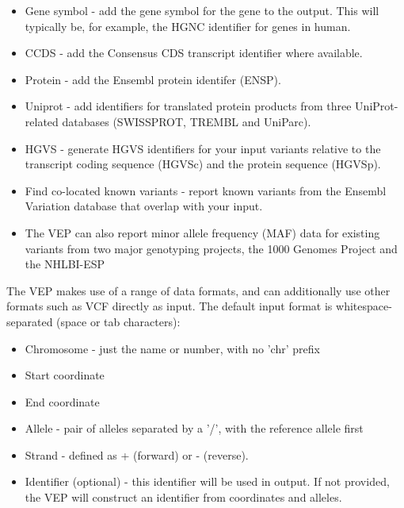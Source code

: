 \documentclass[12pt]{report}
\begin{document}
\begin{itemize}
	 \item Gene symbol - add the gene symbol for the gene to the output. This will typically be, for example, the HGNC identifier for genes in human.
	 
	 \item CCDS - add the Consensus CDS transcript identifier where available.
	 
	 \item Protein - add the Ensembl protein identifer (ENSP).
	 
	 \item Uniprot - add identifiers for translated protein products from three UniProt-related databases (SWISSPROT, TREMBL and UniParc).
	 
	 \item HGVS - generate HGVS identifiers for your input variants relative to the transcript coding sequence (HGVSc) and the protein sequence (HGVSp).
	 
	 \item Find co-located known variants - report known variants from the Ensembl Variation database that overlap with your input.
	 
	\item The VEP can also report minor allele frequency (MAF) data for existing variants from two major genotyping projects, the 1000 Genomes Project and the NHLBI-ESP
	
\end{itemize}

The VEP makes use of a range of data formats, and can additionally use other formats such as VCF directly as input. The default input format is whitespace-separated (space or tab characters):

\begin{itemize}
	\item Chromosome - just the name or number, with no 'chr' prefix
	\item Start coordinate
	\item End coordinate
	\item Allele - pair of alleles separated by a '/', with the reference allele first
	\item Strand - defined as + (forward) or - (reverse).
	\item Identifier (optional) - this identifier will be used in output. If not provided, the VEP will construct an identifier from coordinates and alleles.
	
\end{itemize}
\end{document}

